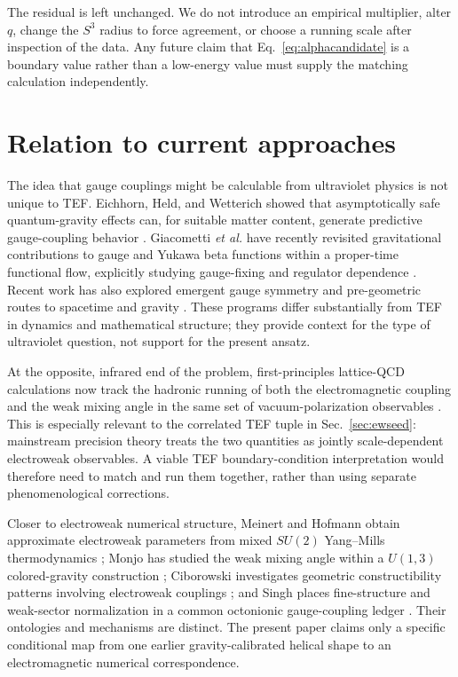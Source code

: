 \documentclass[10pt,twocolumn]{article}
\begin{document}
The residual is left unchanged.  We do not introduce an empirical multiplier, alter $q$, change the
$S^3$ radius to force agreement, or choose a running scale after inspection of the data.  Any future
claim that Eq.~\eqref{eq:alphacandidate} is a boundary value rather than a low-energy value must
supply the matching calculation independently.

\section{Relation to current approaches}

The idea that gauge couplings might be calculable from ultraviolet physics is not unique to TEF.
Eichhorn, Held, and Wetterich showed that asymptotically safe quantum-gravity effects can, for
suitable matter content, generate predictive gauge-coupling behavior \cite{EichhornHeldWetterich}.
Giacometti \emph{et al.} have recently revisited gravitational contributions to gauge and Yukawa
beta functions within a proper-time functional flow, explicitly studying gauge-fixing and regulator
dependence \cite{Giacometti2026}.  Recent work has also explored emergent gauge symmetry and
pre-geometric routes to spacetime and gravity \cite{Bass2026,Addazi2024,Addazi2025}.  These
programs differ substantially from TEF in dynamics and mathematical structure; they provide context
for the type of ultraviolet question, not support for the present ansatz.

At the opposite, infrared end of the problem, first-principles lattice-QCD calculations now track the
hadronic running of both the electromagnetic coupling and the weak mixing angle in the same set of
vacuum-polarization observables \cite{Ce2022,Conigli2026}.  This is especially relevant to the
correlated TEF tuple in Sec.~\ref{sec:ewseed}: mainstream precision theory treats the two quantities
as jointly scale-dependent electroweak observables.  A viable TEF boundary-condition interpretation
would therefore need to match and run them together, rather than using separate phenomenological
corrections.

Closer to electroweak numerical structure, Meinert and Hofmann obtain approximate electroweak
parameters from mixed $SU(2)$ Yang--Mills thermodynamics \cite{MeinertHofmann2024}; Monjo has
studied the weak mixing angle within a $U(1,3)$ colored-gravity construction \cite{Monjo2025};
Ciborowski investigates geometric constructibility patterns involving electroweak couplings
\cite{Ciborowski2025}; and Singh places fine-structure and weak-sector normalization in a common
octonionic gauge-coupling ledger \cite{Singh2026}.  Their ontologies and mechanisms are distinct.
The present paper claims only a specific conditional map from one earlier gravity-calibrated helical
shape to an electromagnetic numerical correspondence.
\end{document}
